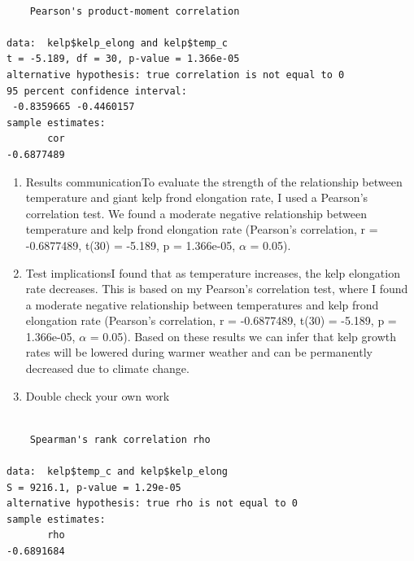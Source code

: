 \documentclass[
  letterpaper,
  DIV=11,
  numbers=noendperiod]{scrartcl}
\newenvironment{Shaded}{\begin{snugshade}}{\end{snugshade}}
\newcommand{\AttributeTok}[1]{\textcolor[rgb]{0.40,0.45,0.13}{#1}}
\newcommand{\CommentTok}[1]{\textcolor[rgb]{0.37,0.37,0.37}{#1}}
\newcommand{\FunctionTok}[1]{\textcolor[rgb]{0.28,0.35,0.67}{#1}}
\newcommand{\NormalTok}[1]{\textcolor[rgb]{0.00,0.23,0.31}{#1}}
\newcommand{\SpecialCharTok}[1]{\textcolor[rgb]{0.37,0.37,0.37}{#1}}
\newcommand{\StringTok}[1]{\textcolor[rgb]{0.13,0.47,0.30}{#1}}
\begin{document}
\begin{verbatim}

    Pearson's product-moment correlation

data:  kelp$kelp_elong and kelp$temp_c
t = -5.189, df = 30, p-value = 1.366e-05
alternative hypothesis: true correlation is not equal to 0
95 percent confidence interval:
 -0.8359665 -0.4460157
sample estimates:
       cor 
-0.6877489 
\end{verbatim}

\begin{enumerate}
\def\labelenumi{\alph{enumi}.}
\setcounter{enumi}{3}
\item
  Results communication\newline To evaluate the strength of the
  relationship between temperature and giant kelp frond elongation rate,
  I used a Pearson's correlation test. We found a moderate negative
  relationship between temperature and kelp frond elongation rate
  (Pearson's correlation, r = -0.6877489, t(30) = -5.189, p = 1.366e-05,
  \(\alpha\) = 0.05).
\item
  Test implications\newline I found that as temperature increases, the
  kelp elongation rate decreases. This is based on my Pearson's
  correlation test, where I found a moderate negative relationship
  between temperatures and kelp frond elongation rate (Pearson's
  correlation, r = -0.6877489, t(30) = -5.189, p = 1.366e-05, \(\alpha\)
  = 0.05). Based on these results we can infer that kelp growth rates
  will be lowered during warmer weather and can be permanently decreased
  due to climate change.
\item
  Double check your own work\newline
\end{enumerate}

\begin{Shaded}
\end{Shaded}

\begin{verbatim}

    Spearman's rank correlation rho

data:  kelp$temp_c and kelp$kelp_elong
S = 9216.1, p-value = 1.29e-05
alternative hypothesis: true rho is not equal to 0
sample estimates:
       rho 
-0.6891684 
\end{verbatim}
\end{document}
